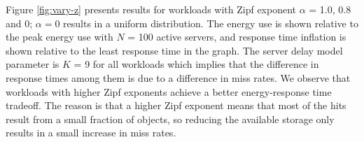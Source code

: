 

						

Figure \ref{fig:vary-z} presents results for workloads with Zipf exponent $\alpha$ = 1.0, 0.8 and 0; $\alpha = 0$ results in a uniform distribution. The energy use is shown relative to the peak energy use with $N$ = 100 active servers, and response time inflation is shown relative to the least response time in the graph. The server  delay model parameter is $K$ = 9 for all workloads which implies that the difference in response times among them is due to a difference in  miss rates. We observe that workloads with higher Zipf exponents achieve a better energy-response time tradeoff. The reason is that a higher Zipf exponent means that most of the hits result from a small fraction of objects, so reducing the available storage only results in a small increase in miss rates. 
	

